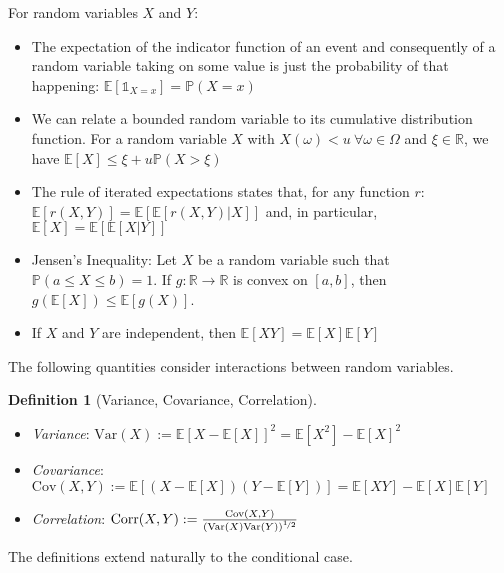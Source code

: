 \documentclass[10pt]{article}
\theoremstyle{definition}
\newtheorem{mydef}{Definition}[section]
\begin{document}
\begin{lemma}
  For random variables \(X\) and \(Y\):
  \begin{itemize}
  \item The expectation of the indicator function of an event and consequently
    of a random variable taking on some value is just the probability of that
    happening: \(\mathbb{E}[\mathbb{1}_{X=x}] = \mathbb{P}(X=x)\)
  \item We can relate a bounded random variable to its cumulative distribution
    function. For a random variable $X$ with \(X(\omega) < u ~ \forall \omega \in
    \Omega\) and \(\xi \in \mathbb{R}\), we have \(\mathbb{E}[X] \leq \xi + u
    \mathbb{P}(X > \xi)\)
  \item The rule of iterated expectations states that, for any function \(r\):
    \(\mathbb{E}[r(X,Y)] = \mathbb{E}\left[\mathbb{E}[r(X,Y) | X]\right]\) and,
    in particular, \(\mathbb{E}[X] = \mathbb{E}[\mathbb{E}[X|Y]]\)
  \item Jensen's Inequality: Let $X$ be a random variable such that
    $\mathbb{P}(a \leq X \leq b)=1$. If $g: \mathbb{R} \to
    \mathbb{R}$ is convex on $[a, b]$, then
    $
    g(\mathbb{E}\left[ X \right]) \leq \mathbb{E}\left[ g(X) \right]
    $.
  \item If \(X\) and \(Y\) are independent, then \(\mathbb{E}\left[XY\right] =
    \mathbb{E}\left[X\right] \mathbb{E}\left[Y\right]\)
  \end{itemize}
\end{lemma}

The following quantities consider interactions between random variables.

\begin{mydef}[Variance, Covariance, Correlation] ~
  \begin{itemize}
  \item \emph{Variance}: \(\text{Var}({X})
    := \mathbb{E}[X - \mathbb{E}[X]]^2
    = \mathbb{E}[X^2] - \mathbb{E}[X]^2\)
  \item \emph{Covariance}: \(\text{Cov}(X, Y)
    := \mathbb{E}[(X- \mathbb{E}[X]) (Y- \mathbb{E}[Y]) ]
    = \mathbb{E}[XY] - \mathbb{E}[X] \mathbb{E}[Y]\)
  \item \emph{Correlation}: $\text{Corr}(X, Y) :=
    \frac{\text{Cov}(X,Y)}{(\text{Var}(X)\text{Var}(Y))^{\nicefrac{1}{2}}}$
  \end{itemize}
\end{mydef}
The definitions extend naturally to the conditional case.
\end{document}
